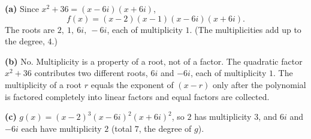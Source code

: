 \textbf{(a)} Since $x^2+36=(x-6i)(x+6i)$,
\[
f(x)=(x-2)(x-1)(x-6i)(x+6i).
\]
The roots are $\boxed{2,\ 1,\ 6i,\ -6i}$, each of multiplicity $1$. (The multiplicities add up to the degree, $4$.)

\textbf{(b)} No. Multiplicity is a property of a root, not of a factor. The quadratic factor $x^2+36$ contributes two different roots, $6i$ and $-6i$, each of multiplicity $1$. The multiplicity of a root $r$ equals the exponent of $(x-r)$ only after the polynomial is factored completely into linear factors and equal factors are collected.

\textbf{(c)} $g(x)=(x-2)^3(x-6i)^2(x+6i)^2$, so $2$ has multiplicity $3$, and $6i$ and $-6i$ each have multiplicity $2$ (total $7$, the degree of $g$).
